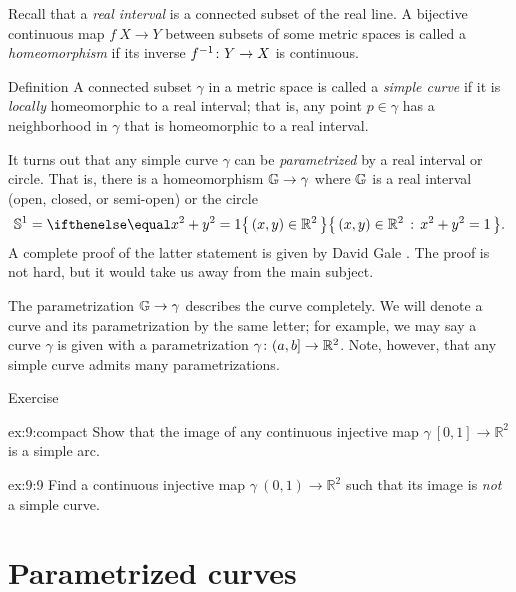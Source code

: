 Recall that a \emph{real interval} is a connected subset of the real line.
A bijective continuous map $f\:X\to Y$ between subsets of some metric spaces is called a {}\emph{homeomorphism} if its inverse $f^{-1}\:Y\z\to X$ is continuous.  

\begin{thm}{Definition} 
A connected subset $\gamma$ in a metric space is called a \emph{simple curve} if it is \emph{locally} homeomorphic to a real interval;
that is, any point $p\in\gamma$ has a neighborhood in $\gamma$ that is homeomorphic to a real interval.
\end{thm}

It turns out that any simple curve $\gamma$ can be \emph{parametrized} by a real interval or circle.
That is, there is a homeomorphism $\mathbb{G}\to\gamma$ 
where $\mathbb{G}$ is a real interval (open, closed, or semi-open) or the circle
\[\mathbb{S}^1=\set{(x,y)\in\mathbb{R}^2}{x^2+y^2=1}.\] 
A complete proof of the latter statement is given by David Gale \cite{gale}.
The proof is not hard, but it would take us away from the main subject.

The parametrization $\mathbb{G}\to\gamma$ describes the curve completely.
We will denote a curve and its parametrization by the same letter;
for example, we may say a curve $\gamma$ is given with a parametrization $\gamma\:(a,b]\z\to \mathbb{R}^2$.
Note, however, that any simple curve admits many parametrizations. 

\begin{thm}{Exercise}\label{ex:9}

\begin{subthm}{ex:9:compact}
Show that the image of any continuous injective map $\gamma\:[0,1]\to\mathbb{R}^2$ is a simple arc.
\end{subthm}

\begin{subthm}{ex:9:9}
Find a continuous injective map $\gamma\:(0,1)\to\mathbb{R}^2$ such that its image is \textit{not} a simple curve.
\end{subthm}

\end{thm}


\section{Parametrized curves}\label{sec:Parametrized curves}


